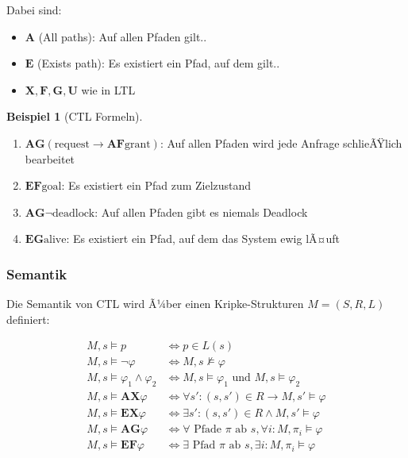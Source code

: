 ﻿\documentclass[a4paper,12pt]{article}
\theoremstyle{definition}
\newtheorem{beispiel}{Beispiel}[section]
\begin{document}
Dabei sind:
\begin{itemize}
	\item[-] $\mathbf{A}$ (All paths): Auf allen Pfaden gilt..
	\item[-] $\mathbf{E}$ (Exists path): Es existiert ein Pfad, auf dem gilt..
	\item[-] $\mathbf{X}, \mathbf{F}, \mathbf{G}, \mathbf{U}$ wie in LTL
\end{itemize}

\begin{beispiel}[CTL Formeln]
	\begin{enumerate}
		\item $\mathbf{AG}(\text{request} \to \mathbf{AF}\text{grant})$: Auf allen Pfaden wird jede Anfrage schlieÃŸlich bearbeitet
		\item $\mathbf{EF}\text{goal}$: Es existiert ein Pfad zum Zielzustand
		\item $\mathbf{AG}\neg\text{deadlock}$: Auf allen Pfaden gibt es niemals Deadlock
		\item $\mathbf{EG}\text{alive}$: Es existiert ein Pfad, auf dem das System ewig lÃ¤uft
	\end{enumerate}
\end{beispiel}

\subsubsection{Semantik}

Die Semantik von CTL wird Ã¼ber einen Kripke-Strukturen $M = (S, R, L)$ definiert:

\begin{align}
M, s \models p &\iff p \in L(s) \\
M, s \models \neg\varphi &\iff M, s \not\models \varphi \\
M, s \models \varphi_1 \land \varphi_2 &\iff M, s \models \varphi_1 \text{ und } M, s \models \varphi_2 \\
M, s \models \mathbf{AX}\varphi &\iff \forall s': (s,s') \in R \to M, s' \models \varphi \\
M, s \models \mathbf{EX}\varphi &\iff \exists s': (s,s') \in R \land M, s' \models \varphi \\
M, s \models \mathbf{AG}\varphi &\iff \forall \text{ Pfade } \pi \text{ ab } s, \forall i: M, \pi_i \models \varphi \\
M, s \models \mathbf{EF}\varphi &\iff \exists \text{ Pfad } \pi \text{ ab } s, \exists i: M, \pi_i \models \varphi
\end{align}
\end{document}

